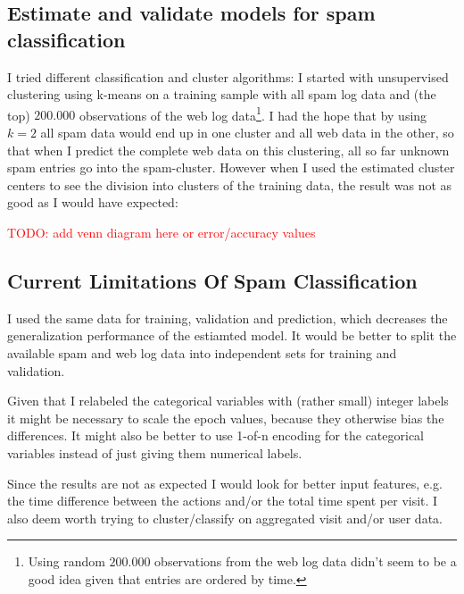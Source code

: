 \documentclass{article}\usepackage[]{graphicx}\usepackage[]{color}
\begin{document}
\subsection{Estimate and validate models for spam classification} %
\label{sub:estimate_and_validate_models_for_spam_classification}
I tried different classification and cluster algorithms: I started with unsupervised clustering using k-means on a training sample with all spam log data and (the top) $200.000$ observations of the web log data\footnote{Using random $200.000$ observations from the web log data didn't seem to be a good idea given that entries are ordered by time.}. I had the hope that by using $k=2$ all spam data would end up in one cluster and all web data in the other, so that when I predict the complete web data on this clustering, all so far unknown spam entries go into the spam-cluster. However when I used the estimated cluster centers to see the division into clusters of the training data, the result was not as good as I would have expected:

\textcolor{red}{TODO: add venn diagram here or error/accuracy values}


\subsection{Current Limitations Of Spam Classification} %
\label{sub:current_limitations}

I used the same data for training, validation and prediction, which decreases the generalization performance of the estiamted model. It would be better to split the available spam and web log data into independent sets for training and validation.

Given that I relabeled the categorical variables with (rather small) integer labels it might be necessary to scale the epoch values, because they otherwise bias the differences. It might also be better to use 1-of-n encoding for the categorical variables instead of just giving them numerical labels.


Since the results are not as expected I would look for better input features, e.g. the time difference between the actions and/or the total time spent per visit. I also deem worth trying to cluster/classify on aggregated visit and/or user data. %

\end{document}
